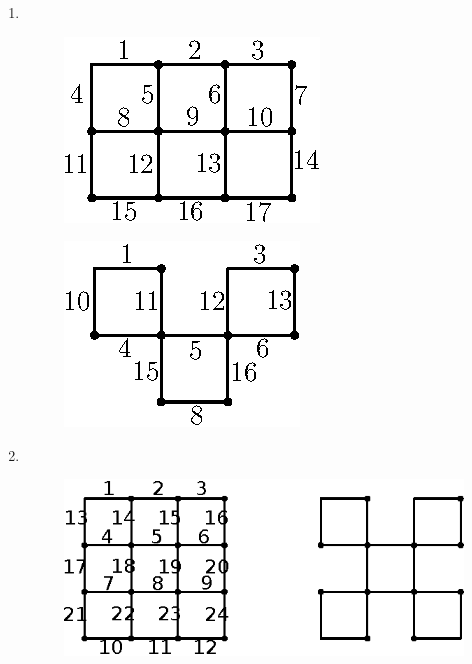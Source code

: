 \begin{enumerate}
\item
~ 

\begin{minipage}[c]{4cm}
\begin{figure}[H]
\centering
{}
\includegraphics{images/chap3/q14.eps}
\end{figure}
\end{minipage}
\begin{minipage}[c]{5cm}
\begin{figure}[H]
\centering
{}
\includegraphics{images/chap3/ans14.eps}
\end{figure}
\end{minipage}

\item
~

\begin{figure}[H]
\centering
{}
\includegraphics{images/chap3/ans15.eps}
\end{figure}




\end{enumerate}
